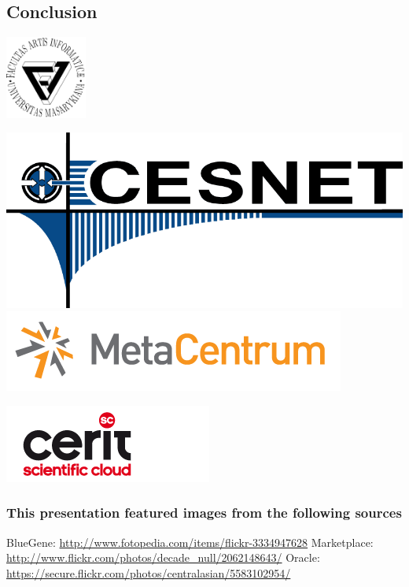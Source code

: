 \subsection{Conclusion}

\begin{frame}
\hspace{0.7cm}
\includegraphics[width=0.2\textwidth]{filogo.pdf}
\hspace{1cm}
\begin{minipage}[b]{0.3\textwidth}
\includegraphics[width=\textwidth]{cesnet-logo-800.png}\newline
\includegraphics[width=\textwidth]{metalogo1.png}
\end{minipage}
\hspace{0.4cm}
\begin{minipage}[b]{0.3\textwidth}
\includegraphics[width=\textwidth]{cerit-sc-logo.png}
\vspace{1cm}
\end{minipage}
\end{frame}

\begin{frame}
	\frametitle{This presentation featured images from the following sources}
	BlueGene: \url{http://www.fotopedia.com/items/flickr-3334947628}\newline
	Marketplace: \url{http://www.flickr.com/photos/decade_null/2062148643/}\newline
	Oracle: \url{https://secure.flickr.com/photos/centralasian/5583102954/}
\end{frame}


